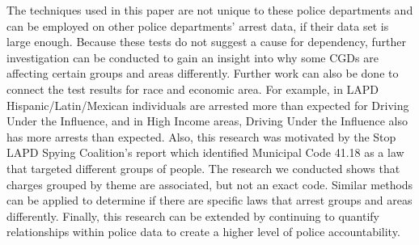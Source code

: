 \documentclass{article}
\newcommand{\miles}[1]{{\color{blue} \sf $\pi$ Miles: [#1]}}
\begin{document}
The techniques used in this paper are not unique to these police departments and can be employed on other  police departments' arrest data, if their data set is large enough. Because these tests do not suggest a cause for dependency, further investigation can be conducted to gain an insight into why some CGDs are affecting certain groups and areas differently. Further work can also be done to connect the test results for race and economic area. For example, in LAPD Hispanic/Latin/Mexican individuals are arrested more than expected for Driving Under the Influence, and in High Income areas, Driving Under the Influence also has more arrests than expected. Also, this research was motivated by the Stop LAPD Spying Coalition's report which identified Municipal Code 41.18 as a law that targeted different groups of people. The research we conducted shows that charges grouped by theme are associated, but not an exact code. Similar methods can be applied to determine if there are specific laws that arrest groups and areas differently. Finally, this research can be extended by continuing to quantify relationships within police data to create a higher level of police accountability.









\appendix
\end{document}
